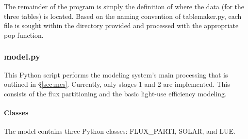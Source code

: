 The remainder of the program is simply the definition of where the data (for the three tables) is located.  
Based on the naming convention of table\textunderscore maker.py, each file is sought within the directory provided and processed with the appropriate pop function.

\subsubsection{model.py}
\label{sec:modelmdpy}
This Python script performs the modeling system's main processing that is outlined in \S \ref{sec:mes}.  
Currently, only stages 1 and 2 are implemented.  
This consists of the flux partitioning and the basic light-use efficiency modeling.

\paragraph{Classes}
\label{par:modelclass}
The model contains three Python classes: FLUX\_PARTI, SOLAR, and LUE.

